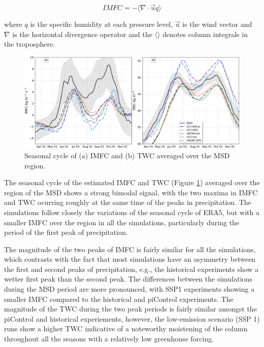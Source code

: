 \begin{equation}
IMFC=-\Bigg\langle \nabla \cdot \vec{u}q \Bigg \rangle
\label{eq:waterbudget}
\end{equation}

\noindent where $q$ is the specific humidity at each pressure level, $\vec{u}$ is the wind vector and $\nabla$ is the horizontal divergence operator and the $\langle \rangle$ denotes column integrals in the troposphere.


 \begin{figure}[t!]
\includegraphics[width=\linewidth]{figures/imfd_index_seasonal}
\caption[Seasonal cycle of IMFC and TWC]{Seasonal cycle of (a) IMFC and (b) TWC averaged over the MSD region.}
\label{fig:imfd_cycle}
\end{figure}

The seasonal cycle of the estimated IMFC and TWC (Figure \ref{fig:imfd_cycle}) averaged over the region of the MSD shows a strong bimodal signal, with the two maxima in IMFC and TWC ocurring roughly at the same time of the peaks in precipitation. The simulations follow closely the variations of the seasonal cycle of ERA5, but with a smaller IMFC over the region in all the simulations, particularly during the period of the first peak of precipitation. 

The magnitude of the two peaks of IMFC is fairly similar for all the simulations, which contrasts with the fact that most simulations have an asymmetry between the first and second peaks of precipitation, e.g., the historical experiments show a wetter first peak than the second peak. The differences between the simulations during the MSD period are more pronounced, with SSP1 experiments showing a smaller IMFC compared to the historical and piControl experiments. 
 The magnitude of the TWC during the two peak periods is fairly similar amongst the piControl and historical experiements, however, the low-emission scenario (SSP 1) runs show a higher TWC indicative of a noteworthy moistening of the column throughout all the seasons with a relatively low greenhouse forcing. 

